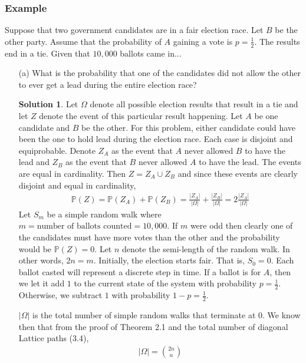 \documentclass[12pt]{article}
\theoremstyle{definition}
\numberwithin{equation}{section}
\newtheorem{solution}{Solution}
\newcommand{\Pro}{\ensuremath{\mathbb{P}}}
\begin{document}
\subsubsection{Example} Suppose that two government candidates are in a fair election race. Let $B$ be the other party. Assume that the probability of $A$ gaining a vote is $p=\frac{1}{2}$. The results end in a tie. Given that $10,000$ ballots came in...
\begin{itemize}[leftmargin=20pt]
    \item[(a)] What is the probability that one of the candidates did not allow the other to ever get a lead during the entire election race?
    
    \begin{solution}
    Let $\Omega$ denote all possible election results that result in a tie and let $Z$ denote the event of this particular result happening. Let $A$ be one candidate and $B$ be the other. For this problem, either candidate could have been the one to hold lead during the election race. Each case is disjoint and equiprobable. Denote $Z_A$ as the event that $A$ never allowed $B$ to have the lead and $Z_B$ as the event that $B$ never allowed $A$ to have the lead. The events are equal in cardinality. Then $Z = Z_A\cup Z_B$ and since these events are clearly disjoint and equal in cardinality, 
    \begin{gather*}
        \Pro(Z) = \Pro(Z_A) + \Pro(Z_B) = \frac{|Z_A|}{|\Omega|} + \frac{|Z_B|}{|\Omega|} = 2\frac{|Z_A|}{|\Omega|}
    \end{gather*}
    Let $S_m$ be a simple random walk where
    $m = \text{number of ballots counted} = 10,000$. If $m$ were odd then clearly one of the candidates must have more votes than the other and the probability would be $\Pro(Z) = 0$. Let $n$ denote the semi-length of the random walk. In other words, $2n = m$. Initially, the election starts fair. That is, $S_0 = 0$. Each ballot casted will represent a discrete step in time. If a ballot is for $A$, then we let it add $1$ to the current state of the system with probability $p=\frac{1}{2}$. Otherwise, we subtract $1$ with probability $1-p = \frac{1}{2}$.
    
    $|\Omega|$ is the total number of simple random walks that terminate at $0$. We know then that from the proof of Theorem 2.1 and the total number of diagonal Lattice paths (3.4),
    \begin{gather*}
        |\Omega| = \binom{2n}{n}
    \end{gather*}
    

\end{solution}
\end{itemize}
\end{document}

